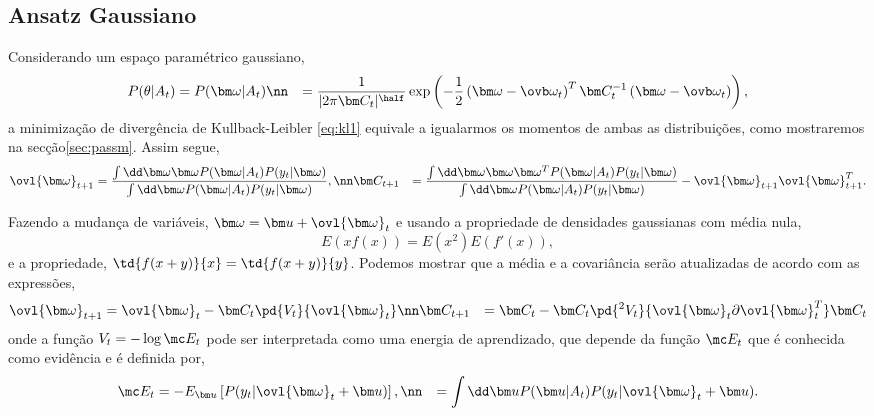 \subsection{Ansatz Gaussiano} %
\label{sec:AnsatzGaussiano}

Considerando um espaço paramétrico gaussiano, 
\begin{align}
    P(\theta|A_t) &= P(\bm \omega |A_t) \nn &=
        \frac{1}{|2\pi\bm C_t|^{\half}}
        \exp \left( - \frac{1}{2} \left(\bm \omega - \ovb \omega_t \right)^T
         \bm C_t^{-1}\left(\bm \omega - \ovb \omega_t \right)\right),
\end{align}
a minimização de divergência de Kullback-Leibler \ref{eq:kl1} equivale
a igualarmos os momentos de ambas as distribuições, como mostraremos na
secção\ref{sec:passm}. Assim segue, 
\begin{align}
    \ovl{\bm \omega}_{t+1} &= 
        \frac{\int \dd \bm \omega \bm \omega P(\bm \omega|A_t)P(y_t|\bm \omega)} 
        {\int \dd \bm \omega P(\bm \omega|A_t)P(y_t|\bm \omega)}, \nn
    \bm C_{t+1} &= \frac{\int \dd \bm \omega 
        \bm \omega \bm \omega^T P(\bm \omega|A_t)P(y_t|\bm \omega)}
        {\int \dd \bm \omega P(\bm \omega|A_t)P(y_t|\bm \omega)}
        -\ovl{\bm \omega}_{t+1}  \ovl{\bm \omega}_{t+1}^T.
    \label{eq:iter1}
\end{align}

Fazendo a mudança de variáveis, $\bm \omega = \bm u + \ovl{ \bm \omega}_t$
e usando a propriedade de densidades gaussianas com média nula,
\[
E(xf(x)) = E(x^2)E(f'(x)),
\label{eq:propg1}
\]
e a propriedade, $ \td{f(x + y)}{x} = \td{f(x + y)}{y}$.
Podemos mostrar que a média e a covariância serão atualizadas de acordo
com as expressões,
\begin{align}
     \ovl{\bm \omega}_{t+1} &= 
            \ovl{\bm \omega}_t - \bm C_t \pd{V_t}{\ovl{\bm \omega}_t} \nn
     \bm C_{t+1} &= 
             \bm C_t 
             - \bm C_t\pd{^2V_t}{\ovl{\bm \omega}_t\partial\ovl{\bm \omega}_t^T}\bm C_t
     \label{eq:iter2}
\end{align}
onde a função $V_t = -\log \mc E_t$ pode ser interpretada como uma
energia de aprendizado, que depende da função $\mc E_t$ que é conhecida
como evidência e é definida por,  
\begin{align}
    \mc E_t &= -  E_{\bm u}\left[P(y_t|\ovl{\bm \omega}_t + \bm u) \right], \nn
      &=  \int\dd \bm u P(\bm u | A_t) P(y_t|\ovl{\bm \omega}_t + \bm u).
\label{eq:evid1}
\end{align}

